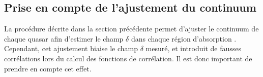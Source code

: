\documentclass[11pt, twoside, a4paper, openright]{report}
\begin{document}
\subsection{Prise en compte de l'ajustement du continuum}
\label{subsec:projdelta}
La procédure décrite dans la section précédente permet d'ajuster le continuum de chaque quasar afin d'estimer le champ $\delta$ dans chaque région d'absorption \lya{}. Cependant, cet ajustement biaise le champ $\delta$ mesuré, et introduit de fausses corrélations lors du calcul des fonctions de corrélation. Il est donc important de prendre en compte cet effet.
\end{document}
